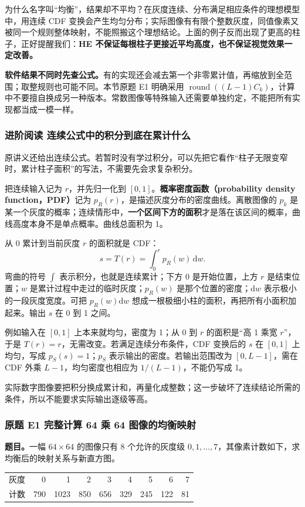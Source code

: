 为什么名字叫“均衡”，结果却不平均？在灰度连续、分布满足相应条件的理想模型中，用连续 CDF 变换会产生均匀分布；实际图像有有限个整数灰度，同值像素又被同一个规则整体映射，不能照搬这个理想结论。上面的例子反而出现了更高的柱子，正好提醒我们：\textbf{HE 不保证每根柱子更接近平均高度，也不保证视觉效果一定改善。}

\textbf{软件结果不同时先查公式。}有的实现还会减去第一个非零累计值，再缩放到全范围；取整规则也可能不同。本节原题 E1 明确采用 $\operatorname{round}((L-1)C_k)$，计算中不要擅自换成另一种版本。常数图像等特殊输入还需要单独约定，不能把所有实现都当成一模一样。

\subsubsection*{进阶阅读 连续公式中的积分到底在累计什么}

原讲义还给出连续公式。若暂时没有学过积分，可以先把它看作“柱子无限变窄时，累计柱子面积”的写法，不需要先会求复杂积分。

把连续输入记为 $r$，并先归一化到 $[0,1]$。\textbf{概率密度函数（probability density function，PDF）}记为 $p_R(r)$，是描述灰度分布的密度曲线。离散图像的 $p_k$ 是某一个灰度的概率；连续情形中，\textbf{一个区间下方的面积}才是落在该区间的概率，曲线高度本身不是单点概率。曲线总面积为 1。

从 0 累计到当前灰度 $r$ 的面积就是 CDF：
\[
s=T(r)=\int_0^r p_R(w)\,\mathrm{d}w.
\]
弯曲的符号 $\int$ 表示积分，也就是连续累计；下方 0 是开始位置，上方 $r$ 是结束位置；$w$ 是累计过程中走过的临时灰度；$p_R(w)$ 是那个位置的密度；$\mathrm{d}w$ 表示极小的一段灰度宽度。可把 $p_R(w)\mathrm{d}w$ 想成一根极细小柱的面积，再把所有小面积加起来。输出 $s$ 在 0 到 1 之间。

例如输入在 $[0,1]$ 上本来就均匀，密度为 1；从 0 到 $r$ 的面积是“高 1 乘宽 $r$”，于是 $T(r)=r$，无需改变。若满足连续分布条件，CDF 变换后的 $s$ 在 $[0,1]$ 上均匀，写成 $p_S(s)=1$；$p_S$ 表示输出的密度。若输出范围改为 $[0,L-1]$，需在 CDF 外乘 $L-1$，均匀密度也相应为 $1/(L-1)$，不能仍写成 1。

实际数字图像要把积分换成累计和，再量化成整数；这一步破坏了连续结论所需的条件，所以不能要求实际输出逐级等高。

\subsubsection*{原题 E1 完整计算 64 乘 64 图像的均衡映射}
\label{original:E1}

\textbf{题目。}一幅 $64\times64$ 的图像只有 8 个允许的灰度级 $0,1,\ldots,7$，其像素计数如下，求均衡后的映射关系与新直方图。
\begin{center}
\begin{tabular}{c|rrrrrrrr}
\toprule
灰度 & 0&1&2&3&4&5&6&7\\
计数 &790&1023&850&656&329&245&122&81\\
\bottomrule
\end{tabular}
\end{center}

